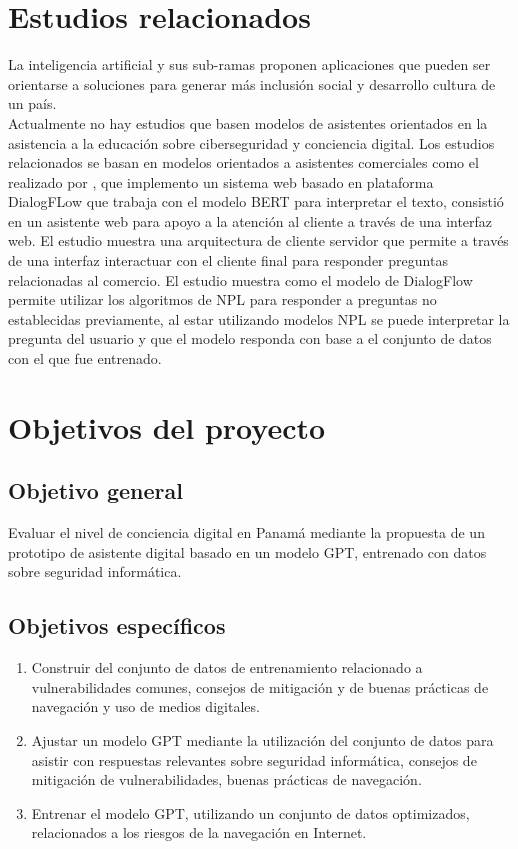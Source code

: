 \section{Estudios relacionados}\label{section: Estudios relacionados}
La inteligencia artificial y sus sub-ramas proponen aplicaciones que pueden ser orientarse a soluciones para generar más inclusión social y desarrollo cultura de un país. \\
Actualmente no hay estudios que basen modelos de asistentes orientados en la asistencia a la educación sobre ciberseguridad y conciencia digital. Los estudios relacionados se basan en modelos orientados a asistentes comerciales como el realizado por \cite{VarelaTapia2022}, que implemento un sistema web basado en plataforma DialogFLow que trabaja con el modelo BERT para interpretar el texto, consistió en un asistente web para apoyo a la atención al cliente a través de una interfaz web. El estudio muestra una arquitectura de cliente servidor que permite a través de una interfaz interactuar con el cliente final para responder preguntas relacionadas al comercio. El estudio muestra como el modelo de DialogFlow permite utilizar los algoritmos de NPL para responder a preguntas no establecidas previamente, al estar utilizando modelos NPL se puede interpretar la pregunta del usuario y que el modelo responda con base a el conjunto de datos con el que fue entrenado.
\section{Objetivos del proyecto}\label{section:Objetivos del proyecto}
\subsection{Objetivo general}\label{section:Objetivo general}
Evaluar el nivel de conciencia digital en Panamá mediante la propuesta  de un prototipo de asistente digital basado en un modelo GPT, entrenado con datos sobre seguridad informática.
\subsection{Objetivos específicos}\label{section:Objetivos especificos}
 \begin{enumerate}
        \item Construir del conjunto de datos de entrenamiento relacionado a vulnerabilidades comunes, consejos de mitigación y de buenas prácticas de navegación y uso de medios digitales.
        \item Ajustar un modelo GPT mediante la utilización del conjunto de datos para asistir con respuestas relevantes sobre seguridad informática, consejos de mitigación de vulnerabilidades, buenas prácticas de navegación.
        \item Entrenar el modelo GPT, utilizando un conjunto de datos optimizados, relacionados a los riesgos de la navegación en Internet. 
    \end{enumerate}
    
